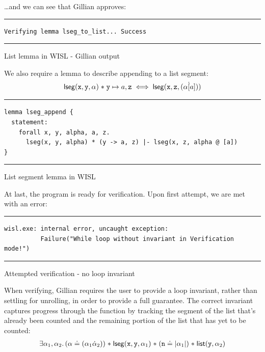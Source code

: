 \ldots and we can see that Gillian approves:

\begin{listing}[!ht]
\noindent\rule{\textwidth}{0.5pt}
\vspace{-0.6cm}
\begin{verbatim}
Verifying lemma lseg_to_list... Success
\end{verbatim}
\vspace{-0.4cm}
\noindent\rule{\textwidth}{0.5pt}
\vspace{-0.6cm}
\caption{List lemma in WISL - Gillian output}
\end{listing}

We also require a lemma to describe appending to a list segment:
\begin{align*}
    \mathsf{lseg}(\mathtt{x}, \mathtt{y}, \alpha) \mathrel{*} \mathtt{y} \mapsto a, \mathtt{z} \iff \mathsf{lseg}(\mathtt{x}, \mathtt{z}, (\alpha \dot [a]))
\end{align*}

\begin{listing}[!ht]
\noindent\rule{\textwidth}{0.5pt}
\vspace{-0.6cm}
\begin{verbatim}
lemma lseg_append {
  statement:
    forall x, y, alpha, a, z.
      lseg(x, y, alpha) * (y -> a, z) |- lseg(x, z, alpha @ [a])
}
\end{verbatim}
\vspace{-0.4cm}
\noindent\rule{\textwidth}{0.5pt}
\vspace{-0.6cm}
\caption{List segment lemma in WISL}
\end{listing}

At last, the program is ready for verification. Upon first attempt, we are met with an error:
\begin{listing}[!ht]
\noindent\rule{\textwidth}{0.5pt}
\vspace{-0.6cm}
\begin{verbatim}
wisl.exe: internal error, uncaught exception:
          Failure("While loop without invariant in Verification mode!")
\end{verbatim}
\vspace{-0.4cm}
\noindent\rule{\textwidth}{0.5pt}
\vspace{-0.6cm}
\caption{Attempted verification - no loop invariant}
\end{listing}

When verifying, Gillian requires the user to provide a loop invariant, rather
than settling for unrolling, in order to provide a full guarantee. The correct
invariant captures progress through the function by tracking the segment of the
list that's already been counted and the remaining portion of the list that has
yet to be counted:
\begin{align*}
    \exists \alpha_1, \alpha_2 \ldotp (\alpha \doteq (\alpha_1 \dot \alpha_2)) \mathrel{*} \mathsf{lseg}(\mathtt{x}, \mathtt{y}, \alpha_1) \mathrel{*} (\mathtt{n} \doteq | \alpha_1 |) \mathrel{*} \mathsf{list}(\mathtt{y}, \alpha_2)
\end{align*}

